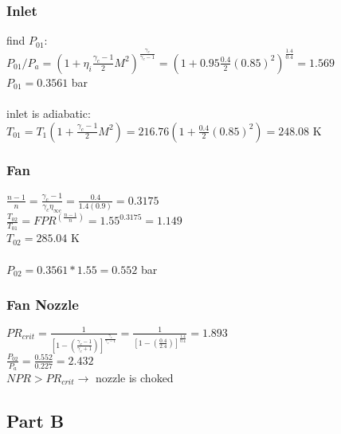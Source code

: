 \documentclass{article}
\begin{document}
\subsubsection*{Inlet}
find $P_{01}$: \\
$P_{01}/P_a=(1+\eta_i\frac{\gamma_c-1}{2}M^2)^\frac{\gamma_c}{\gamma_c-1}=
(1+0.95\frac{0.4}{2}(0.85)^2)^\frac{1.4}{0.4}=1.569$ \\
$P_{01}=0.3561$ bar \\\\
inlet is adiabatic: \\
$T_{01}=T_1(1+\frac{\gamma_c-1}{2}M^2)=216.76(1+\frac{0.4}{2}(0.85)^2)=248.08$ K

\subsubsection*{Fan}
$\frac{n-1}{n}=\frac{\gamma_c-1}{\gamma_c\eta_{\infty c}}=\frac{0.4}{1.4(0.9)}=0.3175$ \\
$\frac{T_{02}}{T_{01}}=FPR^{(\frac{n-1}{n})}=1.55^{0.3175}=1.149$ \\
$T_{02}=285.04$ K \\\\
$P_{02}=0.3561*1.55=0.552$ bar

\subsubsection*{Fan Nozzle}
$PR_{crit}=\frac{1}{[1-(\frac{\gamma_c-1}{\gamma_c+1})]
^\frac{\gamma_c}{\gamma_c-1}}=\frac{1}{[1-(\frac{0.4}{2.4})]
^\frac{1.4}{0.4}}=1.893$ \\
$\frac{P_{02}}{P_a}=\frac{0.552}{0.227}=2.432$ \\
$NPR>PR_{crit} \rightarrow$ nozzle is choked \\

\subsection*{Part B}
\end{document}
